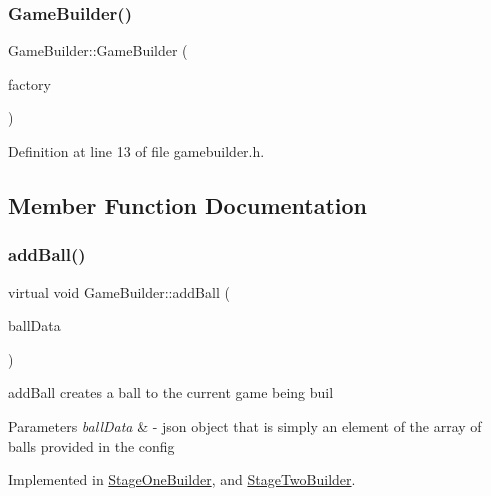 \subsubsection{\texorpdfstring{Game\+Builder()}{GameBuilder()}}
{\footnotesize\ttfamily Game\+Builder\+::\+Game\+Builder (\begin{DoxyParamCaption}\item[{\mbox{\hyperlink{class_abstract_stage_factory}{Abstract\+Stage\+Factory}} $\ast$}]{factory }\end{DoxyParamCaption})\hspace{0.3cm}{\ttfamily [inline]}}



Definition at line 13 of file gamebuilder.\+h.



\subsection{Member Function Documentation}
\mbox{\label{class_game_builder_a836186637bd2f7844f7dfac0135d833b}} 
\subsubsection{\texorpdfstring{add\+Ball()}{addBall()}}
{\footnotesize\ttfamily virtual void Game\+Builder\+::add\+Ball (\begin{DoxyParamCaption}\item[{Q\+Json\+Object \&}]{ball\+Data }\end{DoxyParamCaption})\hspace{0.3cm}{\ttfamily [pure virtual]}}



add\+Ball creates a ball to the current game being buil 


\begin{DoxyParams}{Parameters}
{\em ball\+Data} & -\/ json object that is simply an element of the array of balls provided in the config \\
\hline
\end{DoxyParams}


Implemented in \mbox{\hyperlink{class_stage_one_builder_a9d7931aab89afcfa0b2c23da6fb10bfb}{Stage\+One\+Builder}}, and \mbox{\hyperlink{class_stage_two_builder_a8b2b783294c26b5f40d16bdd54d86301}{Stage\+Two\+Builder}}.

